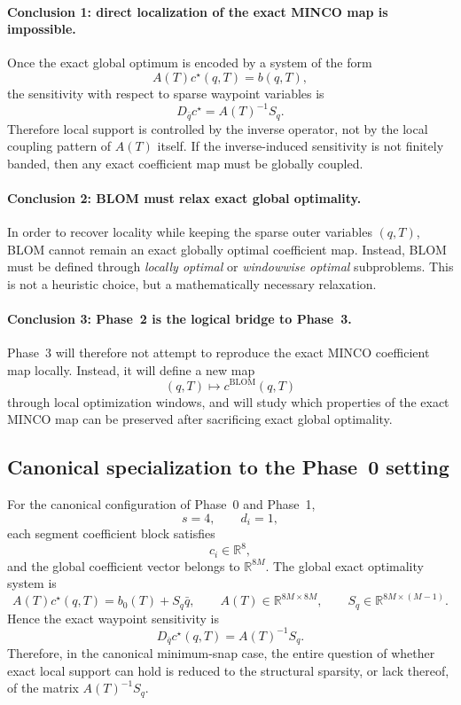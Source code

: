 \paragraph{Conclusion 1: direct localization of the exact MINCO map is impossible.}
Once the exact global optimum is encoded by a system of the form
\[
A(T)c^\star(q,T)=b(q,T),
\]
the sensitivity with respect to sparse waypoint variables is
\[
D_{\bar q}c^\star = A(T)^{-1}S_q.
\]
Therefore local support is controlled by the inverse operator, not by the local coupling pattern of \(A(T)\) itself.
If the inverse-induced sensitivity is not finitely banded, then any exact coefficient map must be globally coupled.

\paragraph{Conclusion 2: BLOM must relax exact global optimality.}
In order to recover locality while keeping the sparse outer variables \((q,T)\), BLOM cannot remain an exact globally optimal coefficient map.
Instead, BLOM must be defined through \emph{locally optimal} or \emph{windowwise optimal} subproblems.
This is not a heuristic choice, but a mathematically necessary relaxation.

\paragraph{Conclusion 3: Phase~2 is the logical bridge to Phase~3.}
Phase~3 will therefore not attempt to reproduce the exact MINCO coefficient map locally.
Instead, it will define a new map
\[
(q,T)\longmapsto c^{\mathrm{BLOM}}(q,T)
\]
through local optimization windows, and will study which properties of the exact MINCO map can be preserved after sacrificing exact global optimality.

\subsection{Canonical specialization to the Phase~0 setting}
\label{subsec:phase2_canonical_specialization}

For the canonical configuration of Phase~0 and Phase~1,
\[
s=4,\qquad d_i=1,
\]
each segment coefficient block satisfies
\[
c_i\in\mathbb R^8,
\]
and the global coefficient vector belongs to \(\mathbb R^{8M}\).
The global exact optimality system is
\[
A(T)c^\star(q,T)=b_0(T)+S_q\bar q,
\qquad
A(T)\in\mathbb R^{8M\times 8M},
\qquad
S_q\in\mathbb R^{8M\times(M-1)}.
\]
Hence the exact waypoint sensitivity is
\[
D_{\bar q}c^\star(q,T)=A(T)^{-1}S_q.
\]
Therefore, in the canonical minimum-snap case, the entire question of whether exact local support can hold is reduced to the structural sparsity, or lack thereof, of the matrix \(A(T)^{-1}S_q\).

